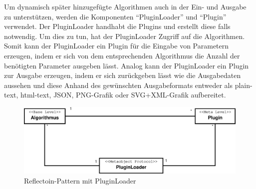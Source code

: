 Um dynamisch später hinzugefügte Algorithmen auch in der Ein- und Ausgabe zu unterstützen, werden die Komponenten "`PluginLoader"' und "`Plugin"' verwendet. Der PluginLoader handhabt die Plugins und erstellt diese falls notwendig. Um dies zu tun, hat der PluginLoader Zugriff auf die Algorithmen. Somit kann der PluginLoader ein Plugin für die Eingabe von Parametern erzeugen, indem er sich von dem entsprechenden Algorithmus die Anzahl der benötigten Parameter ausgeben lässt. Analog kann der PluginLoader ein Plugin zur Ausgabe erzeugen, indem er sich zurückgeben lässt wie die Ausgabedaten aussehen und diese Anhand des gewünschten Ausgabeformats entweder als plain-text, html-text, JSON, PNG-Grafik oder SVG+XML-Grafik aufbereitet.\\
\begin{figure}[h]
\centering
\includegraphics[width=0.9\linewidth]{Grafik/Diagramm/Reflection}
\caption[Reflection-Klasse]{Reflectoin-Pattern mit PluginLoader}
\label{fig:Reflection}
\end{figure}

